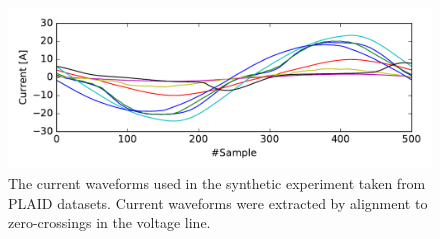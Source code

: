 \begin{figure}
\centering
\includegraphics[width=0.9\linewidth]{factornet/waveforms.pdf}
\caption[FactorNet: The current waveforms used in the synthetic experiment taken from PLAID datasets.]{The current waveforms used in the synthetic experiment taken from PLAID datasets. Current waveforms were extracted by alignment to zero-crossings in the voltage line.}
\label{fig_waveforms}
\end{figure}

